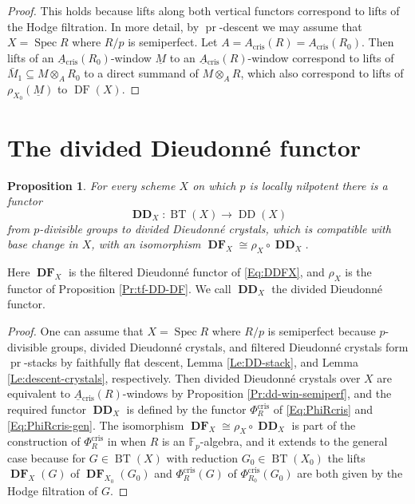\documentclass[a4paper,11pt]{article}
\theoremstyle{plain}
\newtheorem{Prop}[Lemma]{Proposition}
\theoremstyle{definition}
\theoremstyle{remark}
\theoremstyle{definition}
\numberwithin{Lemma}{section}
\numberwithin{Subpoint}{Lemma}
\numberwithin{equation}{section}
\newcommand{\DD}{{\mathbb{D}}}
\newcommand{\FF}{{\mathbb{F}}}
\DeclareMathOperator{\BT}{BT}
\DeclareMathOperator{\DDcat}{DD}
\DeclareMathOperator{\DDfun}{\mathbf {DD}} %
\DeclareMathOperator{\DFcat}{DF}
\DeclareMathOperator{\DFfun}{\mathbf{DF}} %
\DeclareMathOperator{\Spec}{Spec}
\DeclareMathOperator{\cris}{cris}
\newcommand{\nameoftop}{{\operatorname{pr}}}
\renewcommand{\u}{\underline}
\newcommand{\chang}[1]{{#1}}
\begin{document}
\begin{proof}
This holds because lifts \chang{along} both vertical functors correspond to
lifts of the Hodge filtration.
In more detail, by $\nameoftop$-descent we may assume that
$X=\Spec R$ where $R/p$ is semiperfect.
Let $A=A_{\cris}(R)=A_{\cris}(R_0)$.
Then lifts of an $\u A{}_{\cris}(R_0)$-window $\u M$
to an $\u A{}_{\cris}(R)$-window correspond to lifts of
$\bar M_1\subseteq M\otimes_AR_0$ to a direct summand of $M\otimes_AR$,
which also correspond to lifts of $\rho_{X_0}(\u M)$ to $\DFcat(X)$.
\end{proof}

\section{The divided Dieudonn\'e functor}
\label{Se:functor}

\begin{Prop}
\label{Pr:DD-functor}
For \chang{every} scheme $X$ on which $p$ is locally nilpotent
there is a functor
\[
\DDfun_X:\BT(X)\to\DDcat(X)
\] 
from $p$-divisible groups to divided Dieudonn\'e crystals, 
which is compatible with base change in $X$,
with an isomorphism $\DFfun_X\cong\rho_X\circ\DDfun_X$.
\end{Prop}

Here $\DFfun_X$ is the filtered Dieudonn\'e functor of \eqref{Eq:DDFX},
and $\rho_X$ is the functor of Proposition \ref{Pr:tf-DD-DF}.
We call $\DDfun_X$ the divided Dieudonn\'e functor.

\begin{proof}
One can assume that $X=\Spec R$ where $R/p$ is semiperfect
because $p$-divisible groups, divided Dieudonn\'e crystals,
and filtered Dieudonn\'e crystals form $\nameoftop$-stacks by
faithfully flat descent, Lemma \ref{Le:DD-stack}, 
and Lemma \ref{Le:descent-crystals}, respectively.
Then divided Dieudonn\'e crystals over $X$ are equivalent to 
$\u A{}_{\cris}(R)$-windows by Proposition \ref{Pr:dd-win-semiperf},
and the required functor $\DDfun_X$ is \chang{defined by} the functor 
$\Phi_R^{\cris}$ of \eqref{Eq:PhiRcris} and \eqref{Eq:PhiRcris-gen}.
The isomorphism $\DFfun_X\cong\rho_X\circ\DDfun_X$ 
is part of the construction of $\Phi_R^{\cris}$ 
in \cite[Thm.~6.3]{Lau:Semiperfect} when $R$ is an $\FF_p$-algebra,
and it extends to the general case because for $G\in\BT(X)$
with reduction $G_0\in\BT(X_0)$ the lifts
$\DFfun_X(G)$ of $\DFfun_{X_0}(G_0)$ and 
$\Phi_R^{\cris}(G)$ of $\Phi_{R_0}^{\cris}(G_0)$ 
are both given by the Hodge filtration of $G$.
\end{proof}
\end{document}
